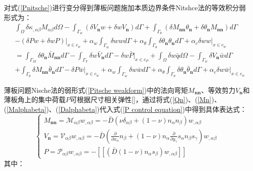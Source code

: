 对式(\ref{Pnitsche})进行变分得到薄板问题施加本质边界条件Nitshce法的等效积分弱形式为：
\begin{equation}\label{Pitsche weakform}
\begin{split}
&\int_{\Omega}\delta\kappa_{,\alpha\beta}M_{\alpha\beta}d\Omega-\int_{\Gamma_w}(\delta V_{\pmb{n}}w+\delta wV_{\pmb{n}})d\Gamma+\int_{\Gamma_{\theta}}(\delta M_{\pmb{nn}}\theta_{\pmb{n}}+\delta\theta_{\pmb{n}}M_{\pmb{nn}})d\Gamma\\&-(\delta Pw+\delta wP)\vert_{x\in c_w}
+\alpha_w\int_{\Gamma_w}\delta wwd\Gamma+\alpha_{\theta}\int_{\Gamma_{\theta}}\delta\theta_{\pmb{n}}\theta_{\pmb{n}}d\Gamma+\alpha_c\delta ww\vert_{x\in c_w}\\
&=\int_{\Gamma_M}\delta\theta_{\pmb{n}}\bar{M}_{\pmb{nn}}d\Gamma-\int_{\Gamma_V}\delta w\bar{V}_{\pmb{n}}d\Gamma-\delta w\bar{P}\vert_{x\in c_P}+\int_{\Omega}\delta w\bar{q}d\Omega
-\int_{\Gamma_w}\delta V_{\pmb{n}}\bar{w}d\Gamma\\&+\int_{\Gamma_{\theta}}\delta M_{\pmb{nn}}\bar{\theta}_{\pmb{n}}d\Gamma-\delta P\bar{w}\vert_{x\in c_w}
+\alpha_w\int_{\Gamma_w}\delta w\bar{w}d\Gamma+\alpha_{\theta}\int_{\Gamma_{\theta}}\delta\theta_{\pmb{n}}\bar{\theta}_{\pmb{n}}d\Gamma+\alpha_c\delta w\bar{w}\vert_{x\in c_w}
\end{split}
\end{equation}\par
薄板问题Nische法的弱形式(\ref{Pitsche weakform})中的法向弯矩$M_{\pmb{nn}}$、等效剪力$V_{\pmb n}$和薄板角上的集中荷载$P$可根据尺寸相关弹性[]，通过将式(\ref{Qn})、(\ref{Mn})、(\ref{Malphabeta})、(\ref{Dalphabeta})代入式(\ref{P control equation})中得到具体表达式：
\begin{equation}
\begin{cases}\label{MVP}
        M_{\pmb{nn}}=\mathcal{M}_{\alpha\beta}w_{,\alpha\beta}=-\bar{D}(\nu\delta_{\alpha\beta}+(1-\nu)n_{\alpha}n_{\beta})w_{,\alpha\beta}\\
        V_{\pmb{n}}=\mathcal{V}_{\alpha\beta}w_{,\alpha\beta}=-\bar{D}(\frac{\partial}{\partial x_{\alpha}}n_{\beta}+(1-\nu)n_{\alpha}\frac{\partial}{\partial y_{\gamma}}s_{\alpha}n_{\beta}s_{\gamma})w_{,\alpha\beta}\\
        P=\mathcal{P}_{\alpha\beta}w_{,\alpha\beta}=-[[(\bar{D}(1-\nu)n_{\alpha}s_{\beta})w_{,\alpha\beta}]]
\end{cases}
\end{equation}
其中：
